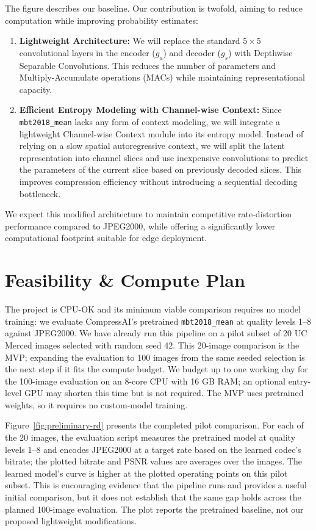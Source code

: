 \documentclass[11pt]{article}
\begin{document}
The figure describes our baseline. Our contribution is twofold, aiming to reduce computation while improving probability estimates:

\begin{enumerate}
    \item \textbf{Lightweight Architecture:} We will replace the standard $5\times5$ convolutional layers in the encoder ($g_a$) and decoder ($g_s$) with Depthwise Separable Convolutions. This reduces the number of parameters and Multiply-Accumulate operations (MACs) while maintaining representational capacity.
    \item \textbf{Efficient Entropy Modeling with Channel-wise Context:} Since \texttt{mbt2018\_mean} lacks any form of context modeling, we will integrate a lightweight Channel-wise Context module into its entropy model. Instead of relying on a slow spatial autoregressive context, we will split the latent representation into channel slices and use inexpensive convolutions to predict the parameters of the current slice based on previously decoded slices. This improves compression efficiency without introducing a sequential decoding bottleneck.
\end{enumerate}

We expect this modified architecture to maintain competitive rate-distortion performance compared to JPEG2000, while offering a significantly lower computational footprint suitable for edge deployment.

\section{Feasibility \& Compute Plan}
\label{sec:feasibility}

The project is CPU-OK and its minimum viable comparison requires no model
training: we evaluate CompressAI's pretrained \texttt{mbt2018\_mean} at quality
levels 1--8 against JPEG2000. We have already run this pipeline on a pilot
subset of 20 UC Merced images selected with random seed 42. This 20-image
comparison is the MVP; expanding the evaluation to 100 images from the same
seeded selection is the next step if it fits the compute budget. We budget up
to one working day for the 100-image evaluation on an 8-core CPU with 16 GB
RAM; an optional entry-level GPU may shorten this time but is not required.
The MVP uses pretrained weights, so it requires no custom-model training.

Figure~\ref{fig:preliminary-rd} presents the completed pilot comparison. For
each of the 20 images, the evaluation script measures the pretrained model at
quality levels 1--8 and encodes JPEG2000 at a target rate based on the learned
codec's bitrate; the plotted bitrate and PSNR values are averages over the
images. The learned model's curve is higher at the plotted operating points
on this pilot subset. This is encouraging evidence that the pipeline runs and
provides a useful initial comparison, but it does not establish that the same
gap holds across the planned 100-image evaluation. The plot reports the
pretrained baseline, not our proposed lightweight modifications.
\end{document}
